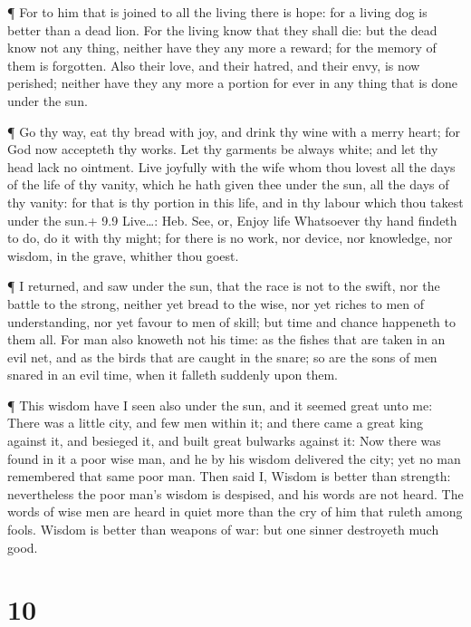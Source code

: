  ¶ For to him that is joined to all the living there is
hope: for a living dog is better than a dead lion.  For the
living know that they shall die: but the dead know not any thing,
neither have they any more a reward; for the memory of them is
forgotten.  Also their love, and their hatred, and their
envy, is now perished; neither have they any more a portion for ever in
any thing that is done under the sun.

 ¶ Go thy way, eat thy bread with joy, and drink thy wine
with a merry heart; for God now accepteth thy works.  Let
thy garments be always white; and let thy head lack no ointment.
 Live joyfully with the wife whom thou lovest all the days
of the life of thy vanity, which he hath given thee under the sun, all
the days of thy vanity: for that is thy portion in this life, and in thy
labour which thou takest under the sun.+ 9.9 Live\ldots: Heb. See, or,
Enjoy life  Whatsoever thy hand findeth to do, do it with
thy might; for there is no work, nor device, nor knowledge, nor wisdom,
in the grave, whither thou goest.

 ¶ I returned, and saw under the sun, that the race is not
to the swift, nor the battle to the strong, neither yet bread to the
wise, nor yet riches to men of understanding, nor yet favour to men of
skill; but time and chance happeneth to them all.  For man
also knoweth not his time: as the fishes that are taken in an evil net,
and as the birds that are caught in the snare; so are the sons of men
snared in an evil time, when it falleth suddenly upon them.

 ¶ This wisdom have I seen also under the sun, and it
seemed great unto me:  There was a little city, and few men
within it; and there came a great king against it, and besieged it, and
built great bulwarks against it:  Now there was found in it
a poor wise man, and he by his wisdom delivered the city; yet no man
remembered that same poor man.  Then said I, Wisdom is
better than strength: nevertheless the poor man's wisdom is despised,
and his words are not heard.  The words of wise men are
heard in quiet more than the cry of him that ruleth among fools.
 Wisdom is better than weapons of war: but one sinner
destroyeth much good.

\hypertarget{section-9}{%
\section{10}\label{section-9}}

